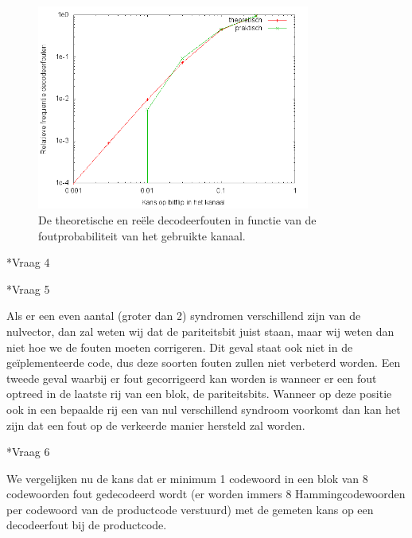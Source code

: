 \documentclass[]{article}
\begin{document}
\begin{section}
\begin{subsection}
        \begin{figure}
            \centering
            \includegraphics[width=0.8\textwidth]{vraag2_3.png}
            \caption{De theoretische en re\"ele decodeerfouten in
                functie van de foutprobabiliteit van het gebruikte
            kanaal.}
            \label{fig:2_3}
        \end{figure}

    \end{subsection}

    \begin{subsection}*{Vraag 4} %
    \end{subsection}

    \begin{subsection}*{Vraag 5} %

        Als er een even aantal (groter dan 2) syndromen verschillend
        zijn van de nulvector, dan zal weten wij dat de pariteitsbit
        juist staan, maar wij weten dan niet hoe we de fouten moeten
        corrigeren. Dit geval staat ook niet in de ge\"iplementeerde
        code, dus deze soorten fouten zullen niet verbeterd worden.
        Een tweede geval waarbij er fout gecorrigeerd kan worden is
        wanneer er een fout optreed in de laatste rij van een blok, de
        pariteitsbits. Wanneer op deze positie ook in een bepaalde rij
        een van nul verschillend syndroom voorkomt dan kan het zijn
        dat een fout op de verkeerde manier hersteld zal worden.

    \end{subsection}

    \begin{subsection}*{Vraag 6} %

        We vergelijken nu de kans dat er minimum 1 codewoord in een
        blok van 8 codewoorden fout gedecodeerd wordt (er worden
        immers 8 Hammingcodewoorden per codewoord van de productcode
        verstuurd) met de gemeten kans op een decodeerfout bij de
        productcode.


\end{subsection}
\end{section}
\end{document}
